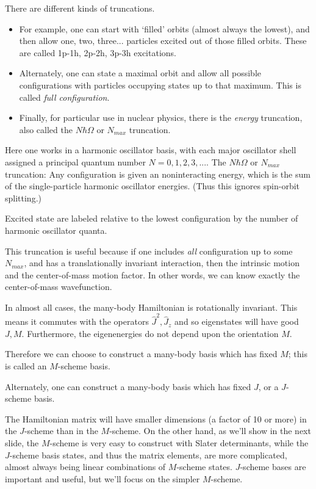 There are different kinds of truncations.

\begin{itemize}
\item For example, one can start with `filled' orbits (almost always the lowest), and then  allow one, two, three... particles excited out of those filled orbits. These are called  1p-1h, 2p-2h, 3p-3h excitations. 

\item Alternately, one can state a maximal orbit and allow all possible configurations with  particles occupying states up to that maximum. This is called \emph{full configuration}.

\item Finally, for particular use in nuclear physics, there is the \emph{energy} truncation, also  called the $N\hbar\Omega$ or $N_{max}$ truncation. 
\end{itemize}

\noindent
Here one works in a harmonic oscillator basis, with each major oscillator shell assigned  a principal quantum number $N=0,1,2,3,...$. 
The $N\hbar\Omega$ or $N_{max}$ truncation: Any configuration is given an noninteracting energy, which is the sum 
of the single-particle harmonic oscillator energies. (Thus this ignores 
spin-orbit splitting.)

Excited state are labeled relative to the lowest configuration by the 
number of harmonic oscillator quanta.

This truncation is useful because if one includes \emph{all} configuration up to 
some $N_{max}$, and has a translationally invariant interaction, then the intrinsic 
motion and the center-of-mass motion factor. In other words, we can know exactly 
the center-of-mass wavefunction. 

In almost all cases, the many-body Hamiltonian is rotationally invariant. This means 
it commutes with the operators $\hat{J}^2, \hat{J}_z$ and so eigenstates will have 
good $J,M$. Furthermore, the eigenenergies do not depend upon the orientation $M$. 


Therefore we can choose to construct a many-body basis which has fixed $M$; this is 
called an $M$-scheme basis. 


Alternately, one can construct a many-body basis which has fixed $J$, or a $J$-scheme 
basis. 

The Hamiltonian matrix will have smaller dimensions (a factor of 10 or more) in the $J$-scheme than in the $M$-scheme. 
On the other hand, as we'll show in the next slide, the $M$-scheme is very easy to 
construct with Slater determinants, while the $J$-scheme basis states, and thus the 
matrix elements, are more complicated, almost always being linear combinations of 
$M$-scheme states. $J$-scheme bases are important and useful, but we'll focus on the 
simpler $M$-scheme.

